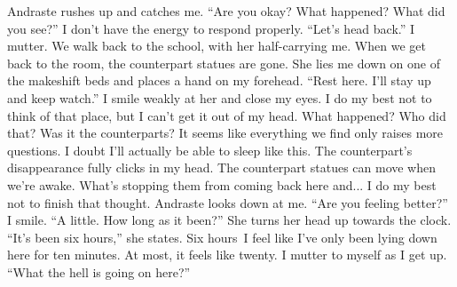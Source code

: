 \documentclass[a4paper, 12pt]{book}
\newcommand\tab[1][1cm]{\hspace*{#1}}
\begin{document}
\newline
\tab
Andraste rushes up and catches me. ``Are you okay? What happened? What did you see?''
\newline
\tab
I don’t have the energy to respond properly. ``Let’s head back.'' I mutter.
\newline
\tab
We walk back to the school, with her half-carrying me. When we get back to the room, the counterpart statues are gone. She lies me down on one of the makeshift beds and places a hand on my forehead. ``Rest here. I’ll stay up and keep watch.'' I smile weakly at her and close my eyes. I do my best not to think of that place, but I can’t get it out of my head. What happened? Who did that? Was it the counterparts? It seems like everything we find only raises more questions. I doubt I’ll actually be able to sleep like this. The counterpart’s disappearance fully clicks in my head.
\newline
\tab
The counterpart statues can move when we’re awake. What’s stopping them from coming back here and... I do my best not to finish that thought. Andraste looks down at me. ``Are you feeling better?''
\newline
\tab
I smile. ``A little. How long as it been?''
\newline
\tab
She turns her head up towards the clock. ``It’s been six hours,'' she states. Six hours\textinterrobang\, I feel like I’ve only been lying down here for ten minutes. At most, it feels like twenty.
\newline
\tab
I mutter to myself as I get up. ``What the hell is going on here?''
\end{document}
